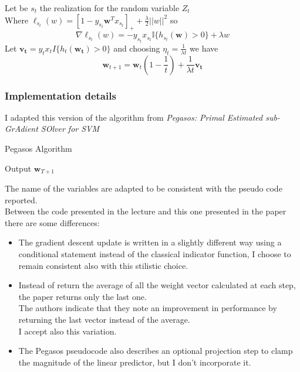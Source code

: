 Let be $s_t$ the realization for the random variable $Z_t$\\ 
Where $\ell_{s_t}(w) = \left[1 - y_{s_t} \boldsymbol{w}^T x_{s_t}\right]_+ + \frac{\lambda}{2} ||w||^2$ so
$$\nabla\ell_{s_t}(w) = -y_{s_t} x_{s_t} \mathbb{I}\{h_{s_t}(\boldsymbol{w}) > 0\} + \lambda w $$
Let $\boldsymbol{v_t} = y_t x_t I\{h_t(\boldsymbol{w_t}) > 0\}$ and choosing $\eta_t = \frac{1}{\lambda t}$ we have
$$\boldsymbol{w}_{t+1} = \boldsymbol{w}_t (1 - \frac{1}{t}) + \frac{1}{\lambda t} \boldsymbol{v_t}$$

\subsubsection{Implementation details}
I adapted this version of the algorithm from \textit{Pegasos: Primal Estimated sub-GrAdient SOlver for SVM}\cite{Pegasos_paper}\\

\begin{algorithm}[H]
    \SetAlgoLined
    \DontPrintSemicolon
    \caption{Pegasos Algorithm}
    Output $\boldsymbol{w}_{T+1}$
\end{algorithm}

The name of the variables are adapted to be consistent with the pseudo code reported.\\
Between the code presented in the lecture and this one presented in the paper there are some differences:\\
\begin{itemize}
    \item The gradient descent update is written in a slightly different way using a conditional statement instead of the classical indicator function, I choose to remain consistent also with this stilistic choice.\\
    \item Instead of return the average of all the weight vector calculated at each step, the paper returns only the last one.\\ 
    The authors indicate that they note an improvement in performance by returning the last vector instead of the average.\\ 
    I accept also this variation.\\
    \item The Pegasos pseudocode also describes an optional projection step to clamp the magnitude of the linear predictor, but I don't incorporate it.\\ 
\end{itemize}

